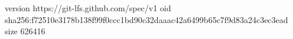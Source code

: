 version https://git-lfs.github.com/spec/v1
oid sha256:f72510e3178b138f99f0ccc1bd90c32daaac42a6499b65c7f9d83a24c3ec3ead
size 626416
